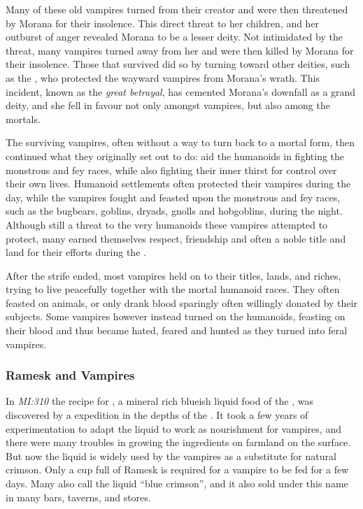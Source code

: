 Many of these old vampires turned from their creator and were then threatened
by Morana for their insolence. This direct threat to her children, and her
outburst of anger revealed Morana to be a lesser deity. Not intimidated by the
threat, many vampires turned away from her and were then killed by Morana for
their insolence. Those that survived did so by turning toward other deities,
such as the , who protected the wayward vampires
from Morana's wrath. This incident, known as the \emph{great betrayal}, has
cemented Morana's downfall as a grand deity, and she fell in favour not only
amongst vampires, but also among the mortals.

The surviving vampires, often without a way to turn back to a mortal form,
then continued what they originally set out to do: aid the humanoids in
fighting the monstrous and fey races, while also fighting their inner thirst
for control over their own lives. Humanoid settlements often protected their
vampires during the day, while the vampires fought and feasted upon the
monstrous and fey races, such as the bugbears, goblins, dryads, gnolls and
hobgoblins, during the night. Although still a threat to the very humanoids
these vampires attempted to protect, many earned themselves respect,
friendship and often a noble title and land for their efforts during
the .

After the strife ended, most vampires held on to their titles, lands, and
riches, trying to live peacefully together with the mortal humanoid races.
They often feasted on animals, or only drank blood sparingly often willingly
donated by their subjects. Some vampires however instead turned on the
humanoids, feasting on their blood and thus became hated, feared and hunted as
they turned into feral vampires.

\subsubsection{Ramesk and Vampires}

In \emph{MI:310} the recipe for , a mineral rich blueish
liquid food of the , was discovered by a
 expedition in the depths of the . It took a few years of experimentation to adapt the liquid to work
as nourishment for vampires, and there were many troubles in growing the
ingredients on farmland on the surface. But now the liquid is widely used by
the vampires as a substitute for natural crimson. Only a cup full of Ramesk is
required for a vampire to be fed for a few days. Many also call the liquid
``blue crimson'', and it also sold under this name in many bars, taverns,
and stores.

